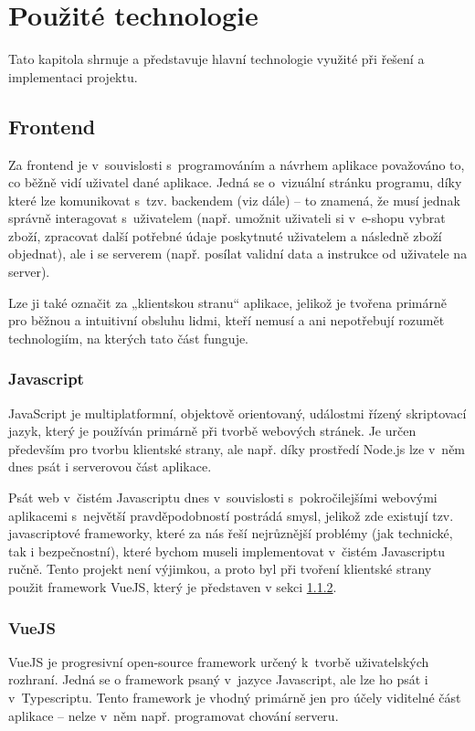 \chapter{Použité technologie}
Tato kapitola shrnuje a představuje hlavní technologie využité při řešení a implementaci projektu.

\section{Frontend}
Za frontend je v~souvislosti s~programováním a návrhem aplikace považováno to, co běžně vidí uživatel dané aplikace. Jedná se o~vizuální stránku programu, díky které lze komunikovat s~tzv. backendem (viz dále) – to znamená, že musí jednak správně interagovat s~uživatelem (např. umožnit uživateli si v~e-shopu vybrat zboží, zpracovat další potřebné údaje poskytnuté uživatelem a následně zboží objednat), ale i se serverem (např. posílat validní data a instrukce od uživatele na server).

Lze ji také označit za „klientskou stranu“ aplikace, jelikož je tvořena primárně pro běžnou a intuitivní obsluhu lidmi, kteří nemusí a ani nepotřebují rozumět technologiím, na kterých tato část funguje. \cite{FEvsBE}

	\subsection{Javascript}
	JavaScript je multiplatformní, objektově orientovaný, událostmi řízený skriptovací jazyk, který je používán primárně při tvorbě webových stránek. Je určen především pro tvorbu klientské strany, ale např. díky prostředí Node.js lze v~něm dnes psát i serverovou část aplikace. \cite{JS1}\cite{JS2}
	
	Psát web v~čistém Javascriptu dnes v~souvislosti s~pokročilejšími webovými aplikacemi s~největší pravděpodobností postrádá smysl, jelikož zde existují tzv. javascriptové frameworky, které za nás řeší nejrůznější problémy (jak technické, tak i bezpečnostní), které bychom museli implementovat v~čistém Javascriptu ručně. Tento projekt není výjimkou, a proto byl při tvoření klientské strany použit framework VueJS, který je představen v sekci \ref{sec:vuejs}.
	
	\subsection{VueJS}\label{sec:vuejs}
	VueJS je progresivní open-source framework určený k~tvorbě uživatelských rozhraní. Jedná se o framework psaný v~jazyce Javascript, ale lze ho psát i v~Typescriptu. Tento framework je vhodný primárně jen pro účely viditelné část aplikace – nelze v~něm např. programovat chování serveru. \cite{VueJS1}
	
